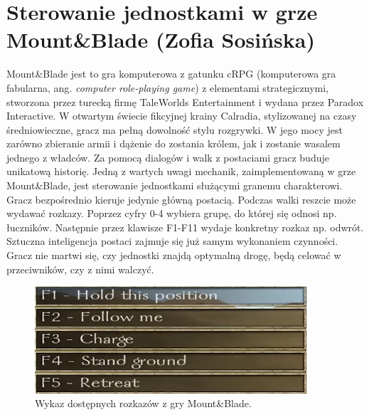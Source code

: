 \section{Sterowanie jednostkami w grze Mount\&Blade (Zofia Sosińska)}\label{chap:mb}

Mount\&Blade jest to gra komputerowa z gatunku cRPG (komputerowa gra fabularna, ang. \textit{computer role-playing game}) z elementami strategicznymi, stworzona przez turecką firmę TaleWorlds Entertainment i wydana przez Paradox Interactive. W otwartym świecie fikcyjnej krainy Calradia, stylizowanej na czasy średniowieczne, gracz ma pełną dowolność stylu rozgrywki. W jego mocy jest zarówno zbieranie armii i dążenie do zostania królem, jak i zostanie wasalem jednego z władców. Za pomocą dialogów i walk z postaciami gracz buduje unikatową historię.
Jedną z wartych uwagi mechanik, zaimplementowaną w grze Mount\&Blade, jest sterowanie jednostkami służącymi granemu charakterowi. Gracz bezpośrednio kieruje jedynie główną postacią. Podczas walki reszcie może wydawać rozkazy. Poprzez cyfry 0-4 wybiera grupę, do której się odnosi np. łuczników. Następnie przez klawisze F1-F11 wydaje konkretny rozkaz np. odwrót. Sztuczna inteligencja postaci zajmuje się już samym wykonaniem czynności. Gracz nie martwi się, czy jednostki znajdą optymalną drogę, będą celować w przeciwników, czy z nimi walczyć.


\begin{figure}[h!tbp]
    \centering
    \includegraphics[width=0.9\textwidth]{images/ui/commandsMountBla.png}
    \caption{Wykaz dostępnych rozkazów z gry Mount\&Blade.}\label{fig:MountnBlade}
    \label{fig:mnb}
\end{figure}
